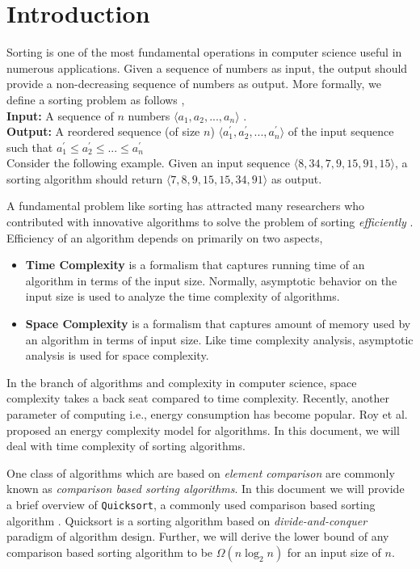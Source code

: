 \documentclass[12pt,twocolumn]{article}
\begin{document}
\section{Introduction}
Sorting is one of the most fundamental operations in computer science useful in numerous applications. Given a sequence of numbers as input, the output should provide a non-decreasing sequence of numbers as output. More formally, we deﬁne a sorting problem as follows \cite{1},\\
\textbf{Input:} A sequence of $n$ numbers $\langle a_1 , a_2 , ..., a_n \rangle$ .\\
\textbf{Output:} A reordered sequence (of size $n$) $\langle a_1^{'} , a_2^{'} , ..., a_n^{'} \rangle$ of the input sequence such that $a_1^{'} \leq a_2^{'} \leq ... \leq a_n^{'}$\\
Consider the following example. Given an input sequence $\langle8, 34, 7, 9, 15, 91, 15\rangle$, a sorting algorithm should return $\langle7, 8, 9, 15, 15, 34, 91\rangle$ as output.
\par A fundamental problem like sorting has attracted many researchers who contributed with innovative algorithms to solve the problem of sorting \textit{efficiently} \cite{3}. Efficiency of an algorithm depends on primarily on two aspects,\\
\begin{itemize}
    \item \textbf{Time Complexity} is a formalism that captures running time of an algorithm in terms of the input size. Normally, asymptotic behavior on the input size is used to analyze the time complexity of algorithms.
    \item \textbf{Space Complexity} is a formalism that captures amount of memory used by an algorithm in terms of input size. Like time complexity analysis, asymptotic analysis is used for space complexity.
\end{itemize}
In the branch of algorithms and complexity in computer science, space complexity takes a back seat compared to time complexity. Recently, another parameter of computing i.e., energy consumption has become popular. Roy et al. \cite{4} proposed an energy complexity model for algorithms. In this document, we will deal with time complexity of sorting algorithms.\par
One class of algorithms which are based on \textit{element comparison} are commonly known as \textit{comparison based sorting algorithms}. In this document we will provide a brief overview of \texttt{Quicksort}, a commonly used comparison based sorting algorithm \cite{2}. Quicksort is a sorting algorithm based on \textit{divide-and-conquer} paradigm of algorithm design. Further, we will derive the lower bound of any comparison based sorting algorithm to be $\Omega(n \log_2 n)$ for an input size of $n$.
\end{document}
